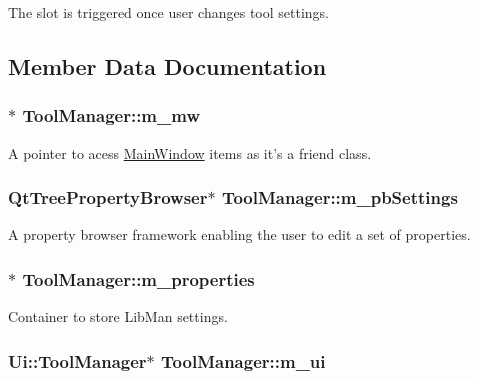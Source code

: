 The slot is triggered once user changes tool settings. 



 

\subsection{Member Data Documentation}
\hypertarget{classToolManager_aaf5b5ff482e6fe661c5ba774c5fde50e}{
\subsubsection[{m\-\_\-mw}]{$\ast$ Tool\-Manager\-::m\-\_\-mw\hspace{0.3cm}{\ttfamily [private]}}}\label{classToolManager_aaf5b5ff482e6fe661c5ba774c5fde50e}
A pointer to acess \hyperlink{classMainWindow}{Main\-Window} items as it's a friend class. \hypertarget{classToolManager_a6b9d5df12862696e13c561277f134e0d}{
\subsubsection[{m\-\_\-pb\-Settings}]{\setlength{\rightskip}{0pt plus 5cm}Qt\-Tree\-Property\-Browser$\ast$ Tool\-Manager\-::m\-\_\-pb\-Settings\hspace{0.3cm}{\ttfamily [private]}}}\label{classToolManager_a6b9d5df12862696e13c561277f134e0d}
A property browser framework enabling the user to edit a set of properties. \hypertarget{classToolManager_af7ce412063a8651c31441376504deda4}{
\subsubsection[{m\-\_\-properties}]{$\ast$ Tool\-Manager\-::m\-\_\-properties\hspace{0.3cm}{\ttfamily [private]}}}\label{classToolManager_af7ce412063a8651c31441376504deda4}
Container to store Lib\-Man settings. \hypertarget{classToolManager_a8cfa8377de1438e8eaa63d549cdeec44}{
\subsubsection[{m\-\_\-ui}]{\setlength{\rightskip}{0pt plus 5cm}Ui\-::\-Tool\-Manager$\ast$ Tool\-Manager\-::m\-\_\-ui\hspace{0.3cm}{\ttfamily [private]}}}\label{classToolManager_a8cfa8377de1438e8eaa63d549cdeec44}
